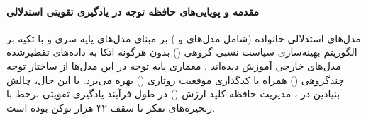 \item {}

\paragraph*{مقدمه و پویایی‌های حافظه توجه در یادگیری تقویتی استدلالی}
مدل‌های استدلالی خانواده  (شامل مدل‌های  و ) بر مبنای مدل‌های پایه سری  و با تکیه بر الگوریتم بهینه‌سازی سیاست نسبی گروهی () بدون هرگونه اتکا به داده‌های تقطیرشده مدل‌های خارجی آموزش دیده‌اند \cite{mistral2025magistral}. معماری پایه توجه در این مدل‌ها از ساختار توجه چندگروهی () همراه با کدگذاری موقعیت روتاری () بهره می‌برد. با این حال، چالش بنیادین در ، مدیریت حافظه کلید-ارزش () در طول فرآیند یادگیری تقویتی برخط با زنجیره‌های تفکر تا سقف ۳۲ هزار توکن بوده است.

